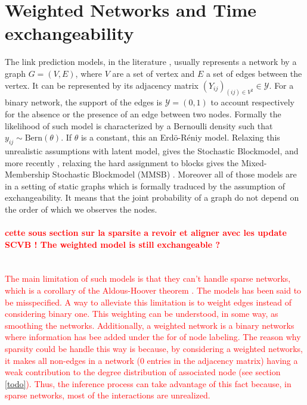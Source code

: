
\section{Weighted Networks and Time exchangeability}

The link prediction models, in the literature \cite{goldenberg2010survey,lu2011link}, usually represents a network by a graph $G=(V,E)$, where $V$ are a set of vertex and $E$ a set of edges between the vertex. It can be represented by its adjacency matrix $(Y_{ij})_{(ij) \in V^2} \in \mathcal{Y}$. For a binary network, the support of the edges is $\mathcal{Y} = (0,1)$ to account respectively for the absence or the presence of an edge between two nodes. Formally the likelihood of such model is characterized by a Bernoulli density such that $y_{ij} \sim \mathrm{Bern}(\theta)$. If $\theta$ is a constant, this an Erdö-Réniy model. Relaxing this unrealistic assumptions with latent model, gives the Stochastic Blockmodel, and more recently , relaxing the hard assignment to blocks gives the Mixed-Membership Stochastic Blockmodel (MMSB) \cite{MMSB}. Moreover all of those models are in a setting of static graphs which is formally traduced by the assumption of exchangeability. It means that the joint probability of a graph do not depend on the order of which we observes the nodes. %

\textcolor{red}{\paragraph{cette sous section sur la sparsite a revoir et aligner avec les update SCVB ! The weighted model is still exchangeable ?}~\\
The main limitation of such models is that they can't handle sparse networks, which is a corollary of the Aldous-Hoover theorem \cite{orbanz2015bayesian}. The models has been said to be misspecified. A way to alleviate this limitation is to weight edges instead of considering binary one. This weighting can be understood, in some way, as smoothing the networks. Additionally, a weighted network is a binary networks where information has bee added under the for of node labeling. The reason why sparsity could be handle this way is because, by considering a weighted networks, it makes all non-edges in a network (0 entries in the adjacency matrix) having a weak contribution to the degree distribution of associated node (see section \ref{todo}). Thus, the inference process can take advantage of this fact because, in sparse networks, most of the interactions are unrealized.}

